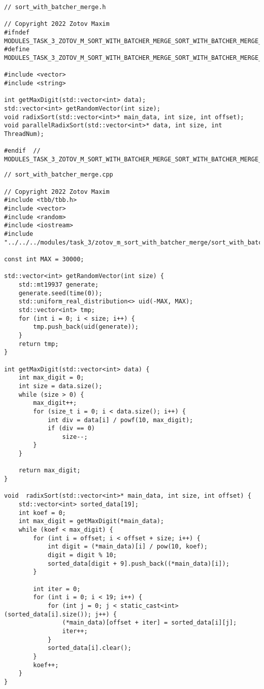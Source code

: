 \documentclass{report}
\begin{document}
\begin{lstlisting}
// sort_with_batcher_merge.h

// Copyright 2022 Zotov Maxim
#ifndef MODULES_TASK_3_ZOTOV_M_SORT_WITH_BATCHER_MERGE_SORT_WITH_BATCHER_MERGE_H_
#define MODULES_TASK_3_ZOTOV_M_SORT_WITH_BATCHER_MERGE_SORT_WITH_BATCHER_MERGE_H_

#include <vector>
#include <string>

int getMaxDigit(std::vector<int> data);
std::vector<int> getRandomVector(int size);
void radixSort(std::vector<int>* main_data, int size, int offset);
void parallelRadixSort(std::vector<int>* data, int size, int ThreadNum);

#endif  // MODULES_TASK_3_ZOTOV_M_SORT_WITH_BATCHER_MERGE_SORT_WITH_BATCHER_MERGE_H_
\end{lstlisting}
\begin{lstlisting}
// sort_with_batcher_merge.cpp

// Copyright 2022 Zotov Maxim
#include <tbb/tbb.h>
#include <vector>
#include <random>
#include <iostream>
#include "../../../modules/task_3/zotov_m_sort_with_batcher_merge/sort_with_batcher_merge.h"

const int MAX = 30000;

std::vector<int> getRandomVector(int size) {
    std::mt19937 generate;
    generate.seed(time(0));
    std::uniform_real_distribution<> uid(-MAX, MAX);
    std::vector<int> tmp;
    for (int i = 0; i < size; i++) {
        tmp.push_back(uid(generate));
    }
    return tmp;
}

int getMaxDigit(std::vector<int> data) {
    int max_digit = 0;
    int size = data.size();
    while (size > 0) {
        max_digit++;
        for (size_t i = 0; i < data.size(); i++) {
            int div = data[i] / powf(10, max_digit);
            if (div == 0)
                size--;
        }
    }

    return max_digit;
}

void  radixSort(std::vector<int>* main_data, int size, int offset) {
    std::vector<int> sorted_data[19];
    int koef = 0;
    int max_digit = getMaxDigit(*main_data);
    while (koef < max_digit) {
        for (int i = offset; i < offset + size; i++) {
            int digit = (*main_data)[i] / pow(10, koef);
            digit = digit % 10;
            sorted_data[digit + 9].push_back((*main_data)[i]);
        }

        int iter = 0;
        for (int i = 0; i < 19; i++) {
            for (int j = 0; j < static_cast<int>(sorted_data[i].size()); j++) {
                (*main_data)[offset + iter] = sorted_data[i][j];
                iter++;
            }
            sorted_data[i].clear();
        }
        koef++;
    }
}


\end{lstlisting}
\end{document}
